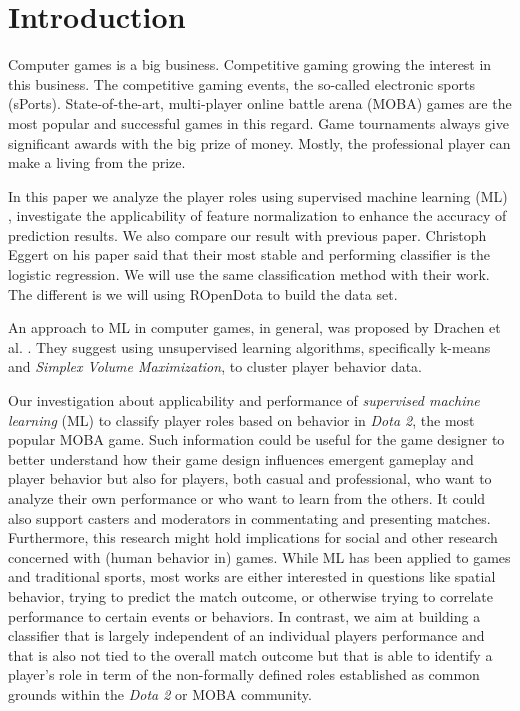 \section{Introduction}

Computer games is a big business. Competitive gaming growing the interest in this business. The competitive gaming events, the so-called electronic sports (sPorts). State-of-the-art, multi-player online battle arena (MOBA) games are the most popular and successful games in this regard. Game tournaments always give significant awards with the big prize of money. Mostly, the professional player can make a living from the prize. 

In this paper we analyze the player roles using supervised machine learning (ML) , investigate the applicability of feature normalization to enhance the accuracy of prediction results. We also compare our result with previous paper. Christoph Eggert on his paper said that their most stable and performing classifier is the logistic regression. We will use the same classification method with their work. The different is we will using ROpenDota to build the data set.

An approach to ML in computer games, in general, was proposed by Drachen et al.\cite{drachen2014skill} . They suggest using unsupervised learning algorithms, specifically k-means and \textit{Simplex Volume Maximization}, to cluster player behavior data.

Our investigation about applicability and performance of \textit{supervised machine learning} (ML) to classify player roles based on behavior in \textit{Dota 2}, the most popular MOBA game. Such information could be useful for the game designer to better understand how their game design influences emergent gameplay and player behavior but also for players, both casual and professional, who want to analyze their own performance or who want to learn from the others. It could also support casters and moderators in commentating and presenting matches. Furthermore, this research might hold implications for social and other research concerned with (human behavior in) games. While ML has been applied to games and traditional sports, most works are either interested in questions like spatial behavior, trying to predict the match outcome, or otherwise trying to correlate performance to certain events or behaviors. In contrast, we aim at building a classifier that is largely independent of an individual players performance and that is also not tied to the overall match outcome but that is able to identify a player's role in term of the non-formally defined roles established as common grounds within the \textit{Dota 2} or MOBA community.

